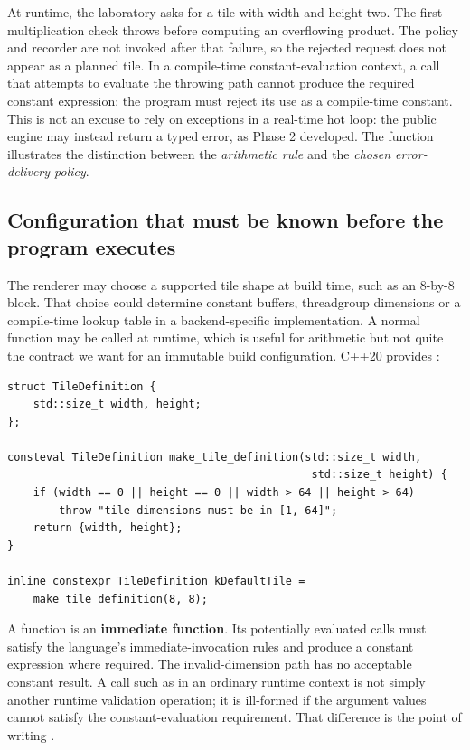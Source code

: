 At runtime, the laboratory asks for a tile with width  and height two. The first multiplication check throws before computing an overflowing product. The policy and recorder are not invoked after that failure, so the rejected request does not appear as a planned tile. In a compile-time constant-evaluation context, a call that attempts to evaluate the throwing path cannot produce the required constant expression; the program must reject its use as a compile-time constant. This is not an excuse to rely on exceptions in a real-time hot loop: the public engine may instead return a typed error, as Phase 2 developed. The function illustrates the distinction between the \emph{arithmetic rule} and the \emph{chosen error-delivery policy}.

\subsection{Configuration that must be known before the program executes}\label{01-foundations-i-ch005-configuration-that-must-be-known-before-the-program-executes}

\hypertarget{01-foundations-i-ch005-configuration-that-must-be-known-before-the-program-executes}{}

The renderer may choose a supported tile shape at build time, such as an 8-by-8 block. That choice could determine constant buffers, threadgroup dimensions or a compile-time lookup table in a backend-specific implementation. A normal  function may be called at runtime, which is useful for arithmetic but not quite the contract we want for an immutable build configuration. C++20 provides :

\begin{verbatim}
struct TileDefinition {
    std::size_t width, height;
};

consteval TileDefinition make_tile_definition(std::size_t width,
                                               std::size_t height) {
    if (width == 0 || height == 0 || width > 64 || height > 64)
        throw "tile dimensions must be in [1, 64]";
    return {width, height};
}

inline constexpr TileDefinition kDefaultTile =
    make_tile_definition(8, 8);
\end{verbatim}

A  function is an \textbf{immediate function}. Its potentially evaluated calls must satisfy the language's immediate-invocation rules and produce a constant expression where required. The invalid-dimension path has no acceptable constant result. A call such as  in an ordinary runtime context is not simply another runtime validation operation; it is ill-formed if the argument values cannot satisfy the constant-evaluation requirement. That difference is the point of writing .

